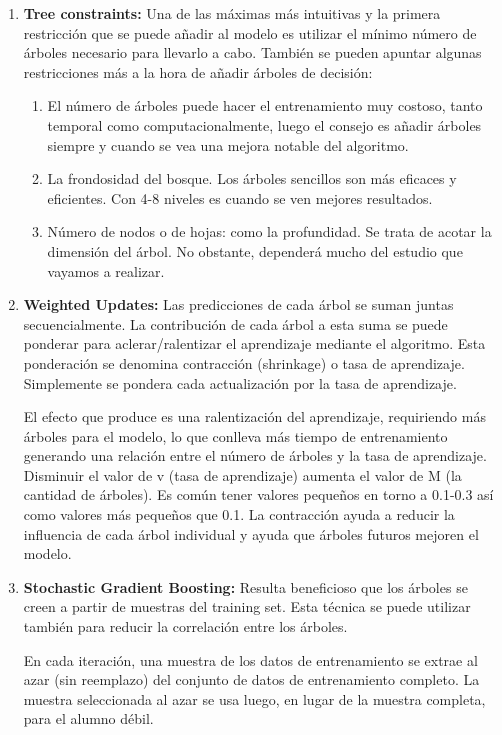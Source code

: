 \begin{enumerate}
\item \textbf{Tree constraints:} Una de las máximas más intuitivas y la primera restricción que se puede añadir al modelo es utilizar  el mínimo número de árboles necesario para llevarlo a cabo. También se pueden apuntar algunas restricciones más a la hora de añadir árboles de decisión:
\begin{enumerate}
\item El número de árboles puede hacer el entrenamiento muy costoso, tanto temporal como computacionalmente, luego el consejo es añadir árboles siempre y cuando se vea una mejora notable del algoritmo.
\item La frondosidad del bosque. Los árboles sencillos son más eficaces y eficientes. Con 4-8 niveles es cuando se ven mejores resultados.
\item Número de nodos o de hojas: como la profundidad. Se trata de acotar la dimensión del árbol. No obstante, dependerá mucho del estudio que vayamos a realizar.

\end{enumerate}
\item \textbf{Weighted Updates:} Las predicciones de cada árbol se suman juntas secuencialmente. La contribución de cada árbol a esta suma se puede ponderar para aclerar/ralentizar el aprendizaje mediante el algoritmo. Esta ponderación se denomina contracción (shrinkage) o tasa de aprendizaje. Simplemente se pondera cada actualización por la tasa de aprendizaje. \par 
El efecto que produce es una ralentización del aprendizaje, requiriendo más árboles para el modelo, lo que conlleva más tiempo de entrenamiento generando una relación entre el número de árboles y la tasa de aprendizaje. Disminuir el valor de v (tasa de aprendizaje) aumenta el valor de M (la cantidad de árboles). Es común tener valores pequeños en torno a 0.1-0.3 así como valores más pequeños que 0.1.
La contracción ayuda a reducir la influencia de cada árbol individual y ayuda que árboles futuros mejoren el modelo.

\item \textbf{Stochastic Gradient Boosting:} Resulta beneficioso que los árboles se creen a partir de muestras del training set. Esta técnica se puede utilizar también para reducir la correlación entre los árboles.\par 

En cada iteración, una muestra de los datos de entrenamiento se extrae al azar (sin reemplazo) del conjunto de datos de entrenamiento completo. La muestra seleccionada al azar se usa luego, en lugar de la muestra completa, para el alumno débil.

\end{enumerate}

